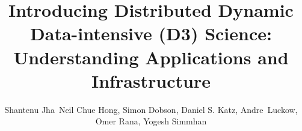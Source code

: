 




\title{Introducing Distributed Dynamic Data-intensive (D3) Science:
  Understanding Applications and Infrastructure}



\author{Shantenu Jha\corrauth\, Neil Chue Hong,
  Simon Dobson, Daniel S. Katz,
  Andre~Luckow, Omer Rana, Yogesh Simmhan}



\address{Rutgers University\break
{}University of Edinburgh\break
{}University of St.~Andrews\break
{}University of Chicago\break
{}Argonne National Laboratory\break
{}Cardiff University\break
{}Indian Institute of Science\break
}





